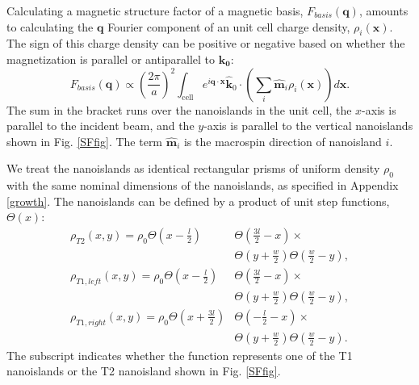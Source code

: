 \documentclass[aps, prb, reprint, showpacs, superscriptaddress]{revtex4-1}
\begin{document}
Calculating a magnetic structure factor of a magnetic basis, $F_{basis}(\boldsymbol{q})$, amounts to calculating the $\boldsymbol{q}$ Fourier component of an unit cell charge density, $\rho_i(\boldsymbol{x})$. 
The sign of this charge density can be positive or negative based on whether the magnetization is parallel or antiparallel to $\boldsymbol{k_0}$:
\renewcommand{\theequation}{\Alph{section}\arabic{equation}}
\begin{equation}
F_{basis}(\boldsymbol{q}) \propto \left( \frac{2\pi}{a} \right)^2 \int_{\text{cell}} e^{i \boldsymbol{q} \cdot \boldsymbol{x} } \boldsymbol{\hat{k}}_0 \cdot \left(\sum_i \boldsymbol{\hat{m}}_i  \rho_i(\boldsymbol{x}) \right) d\boldsymbol{x}.
\label{sofq}
\end{equation}
The sum in the bracket runs over the nanoislands in the unit cell, the $x$-axis is parallel to the incident beam, and the $y$-axis is parallel to the vertical nanoislands shown in Fig. \ref{SFfig}. 
The term $\boldsymbol{\hat{m}}_i$ is the macrospin direction of nanoisland $i$.

We treat the nanoislands as identical rectangular prisms of uniform density $\rho_0$ with the same nominal dimensions of the nanoislands, as specified in Appendix \ref{growth}.
The nanoislands can be defined by a product of unit step functions, $\Theta(x)$: 
\begin{align}
\rho_{T2}(x,y) = \rho_0 \Theta( x - \frac{l}{2} )& \Theta( \frac{3l}{2} - x ) \times \nonumber \\
			&  \Theta( y + \frac{w}{2} ) \Theta( \frac{w}{2} - y  ), \nonumber \\
\rho_{T1,left}(x,y) = \rho_0  \Theta( x - \frac{l}{2} )& \Theta( \frac{3l}{2} - x ) \times \nonumber \\
			&  \Theta( y + \frac{w}{2} ) \Theta( \frac{w}{2} - y  ), \nonumber \\
\rho_{T1,right}(x,y) = \rho_0  \Theta( x + \frac{3l}{2} )& \Theta( - \frac{l}{2} - x ) \times \nonumber \\
			&  \Theta( y + \frac{w}{2} ) \Theta( \frac{w}{2} - y  ).
\label{density-functions}
\end{align}
The subscript indicates whether the function represents one of the T1 nanoislands or the T2 nanoisland shown in Fig. \ref{SFfig}.
 
\end{document}
